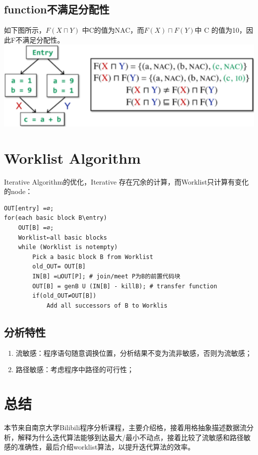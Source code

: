 \documentclass[a4paper]{article}
\theoremstyle{definition}
\begin{document}
\subsection{function不满足分配性}
如下图所示，$F(X \sqcap Y)$ 中C的值为NAC，而$F(X) \sqcap F(Y)$中 C 的值为10，因此F不满足分配性。
\includegraphics{img/Snipaste_2021-06-04_16-52-23.png}
\section{Worklist Algorithm}
Iterative Algorithm的优化，Iterative 存在冗余的计算，而Worklist只计算有变化的node：
\begin{lstlisting}
OUT[entry] =∅;
for(each basic block B\entry) 
	OUT[B] =∅;
    Worklist←all basic blocks
	while (Worklist is notempty) 
    	Pick a basic block B from Worklist
		old_OUT= OUT[B]
        IN[B] =⊔OUT[P]; # join/meet P为B的前置代码块
        OUT[B] = genB U (IN[B] - killB); # transfer function 
        if(old_OUT≠OUT[B])
        	Add all successors of B to Worklis
\end{lstlisting}

\subsection{分析特性}
\begin{enumerate}
  \item 流敏感：程序语句随意调换位置，分析结果不变为流非敏感，否则为流敏感；
  \item 路径敏感：考虑程序中路径的可行性；
\end{enumerate}

\section{总结}
本节来自南京大学Bilibili程序分析课程，主要介绍格，接着用格抽象描述数据流分析，解释为什么迭代算法能够到达最大/最小不动点，接着比较了流敏感和路径敏感的准确性，最后介绍worklist算法，以提升迭代算法的效率。
\end{document}
